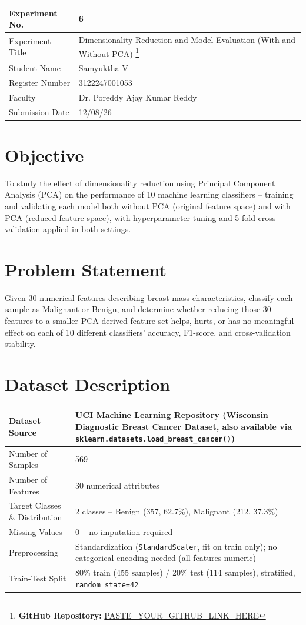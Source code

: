 \documentclass[12pt,a4paper]{article}
\begin{document}
\begin{tabular}{|p{4cm}|p{11cm}|}
\hline
Experiment No. & 6 \\ \hline
Experiment Title & Dimensionality Reduction and Model Evaluation (With and Without PCA)
\footnote{\textbf{GitHub Repository: }\url{PASTE_YOUR_GITHUB_LINK_HERE}}\\ \hline
Student Name & Samyuktha V \\ \hline
Register Number & 3122247001053 \\ \hline
Faculty & Dr. Poreddy Ajay Kumar Reddy \\ \hline
Submission Date & 12/08/26 \\ \hline
\end{tabular}

\section{Objective}
To study the effect of dimensionality reduction using Principal Component Analysis
(PCA) on the performance of 10 machine learning classifiers -- training and
validating each model both without PCA (original feature space) and with PCA
(reduced feature space), with hyperparameter tuning and 5-fold cross-validation
applied in both settings.

\section{Problem Statement}
Given 30 numerical features describing breast mass characteristics, classify each
sample as Malignant or Benign, and determine whether reducing those 30 features to
a smaller PCA-derived feature set helps, hurts, or has no meaningful effect on
each of 10 different classifiers' accuracy, F1-score, and cross-validation
stability.

\section{Dataset Description}
\begin{longtable}{|p{6cm}|p{8cm}|}
\hline
Dataset Source & UCI Machine Learning Repository (Wisconsin Diagnostic Breast
Cancer Dataset, also available via \texttt{sklearn.datasets.load\_breast\_cancer()}) \\ \hline
Number of Samples & 569 \\ \hline
Number of Features & 30 numerical attributes \\ \hline
Target Classes \& Distribution & 2 classes -- Benign (357, 62.7\%), Malignant
(212, 37.3\%) \\ \hline
Missing Values & 0 -- no imputation required \\ \hline
Preprocessing & Standardization (\texttt{StandardScaler}, fit on train only);
no categorical encoding needed (all features numeric) \\ \hline
Train-Test Split & 80\% train (455 samples) / 20\% test (114 samples), stratified,
\texttt{random\_state=42} \\ \hline
\end{longtable}
\end{document}
